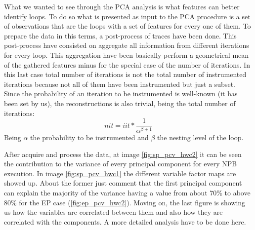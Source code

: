 What we wanted to see through the PCA analysis is what features can better
identify loops. To do so what is presented as input to the PCA procedure is a
set of observations that are the loops with a set of features for every one of
them. To prepare the data in this terms, a post-process of traces have been
done. This post-process have consisted on aggregate all information from different
iterations for every loop. This aggregation have been basically perform a
geometrical mean of the gathered features minus for the special case of the
number of iterations. In this last case total number of iterations is not the
total number of instrumented iterations because not all of them have been
instrumented but just a subset. Since the probability of an iteration to be
instrumented is well-known (it has been set by us), the reconstructions is also
trivial, being the total number of iterations:
$$
nit = iit*\frac{1}{\alpha^{\beta+1}}
$$
Being $\alpha$ the probability to be instrumented and $\beta$ the nesting level
of the loop.

After acquire and process the data, at image \ref{fig:sp_pcv_hwc2} it can be
seen the contribution to the variance of every principal component for every NPB
execution. In image \ref{fig:sp_pcv_hwc1} the different variable factor maps are
showed up. About the former just comment that the first principal component can
explain the majority of the variance having a value from about 70\% to above
80\% for the EP case (\ref{fig:ep_pcv_hwc2}). Moving on, the last figure is 
showing us how the variables are correlated between them and also how they are 
correlated with the components. A more detailed analysis have to be done here.

